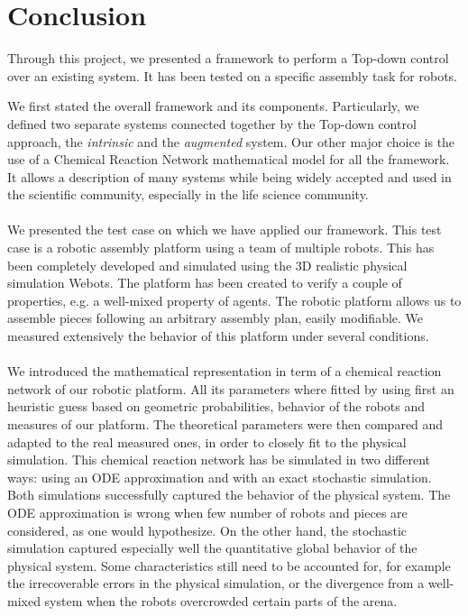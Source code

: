 \section{Conclusion} %
\label{sec:conclusion}
	Through this project, we presented a framework to perform a Top-down control over an existing system. It has been tested on a specific assembly task for robots.
	
	We first stated the overall framework and its components. Particularly, we defined two separate systems connected together by the Top-down control approach, the \textit{intrinsic} and the \textit{augmented} system. Our other major choice is the use of a Chemical Reaction Network mathematical model for all the framework. It allows a description of many systems while being widely accepted and used in the scientific community, especially in the life science community.

	\paragraph{}	
	We presented the test case on which we have applied our framework. This test case is a robotic assembly platform using a team of multiple robots. This has been completely developed and simulated using the 3D realistic physical simulation Webots. The platform has been created to verify a couple of properties, e.g. a well-mixed property of agents. The robotic platform allows us to assemble pieces following an arbitrary assembly plan, easily modifiable. We measured extensively the behavior of this platform under several conditions.
	
	\paragraph{}
	We introduced the mathematical representation in term of a chemical reaction network of our robotic platform. All its parameters where fitted by using first an heuristic guess based on geometric probabilities, behavior of the robots and measures of our platform. The theoretical parameters were then compared and adapted to the real measured ones, in order to closely fit to the physical simulation. This chemical reaction network has be simulated in two different ways: using an ODE approximation and with an exact stochastic simulation. Both simulations successfully captured the behavior of the physical system. The ODE approximation is wrong when few number of robots and pieces are considered, as one would hypothesize. On the other hand, the stochastic simulation captured especially well the quantitative global behavior of the physical system. Some characteristics still need to be accounted for, for example the irrecoverable errors in the physical simulation, or the divergence from a well-mixed system when the robots overcrowded certain parts of the arena.

